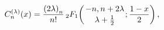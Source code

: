 \[\mathop{C^{(\lambda)}_{n}\/}\nolimits\!\left(x\right)=\frac{\left(2\lambda%
\right)_{n}}{n!}\mathop{{{}_{2}F_{1}}\/}\nolimits\!\left({-n,n+2\lambda\atop%
\lambda+\tfrac{1}{2}};\frac{1-x}{2}\right),\]